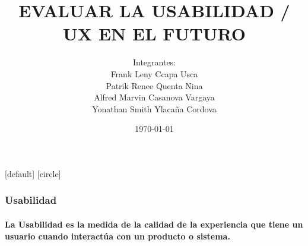 \documentclass[10pt]{beamer}
\title[Evaluacion de la Usabilidad ]{EVALUAR LA USABILIDAD / UX EN EL FUTURO}
\theoremstyle{remark}
\theoremstyle{definition}
\begin{document}
\author[Interaccion Humano Computador]{
	\begin{tabular}{c} 
	\Large
        Integrantes:  \\
            Frank Leny Ccapa Usca\\
			Patrik Renee Quenta Nina\\
			Alfred Marvin Casanova Vargaya\\
			Yonathan Smith Ylacaña Cordova
\\
    \footnotesize 
\end{tabular}
\vspace{-4ex}}


\date{\today}

\begin{noheadline}
\begin{frame}\maketitle\end{frame}
\end{noheadline}

[default]
[circle]

\begin{frame}
	\frametitle{} %
	\tableofcontents{} %
	\begin{center}
	    \frametitle{Usabilidad}
	    \paragraph{
	    La Usabilidad es la medida de la calidad de la experiencia que tiene un usuario cuando interactúa con un producto o sistema. 
	    }
	\end{center}
\end{frame}
\end{document}
